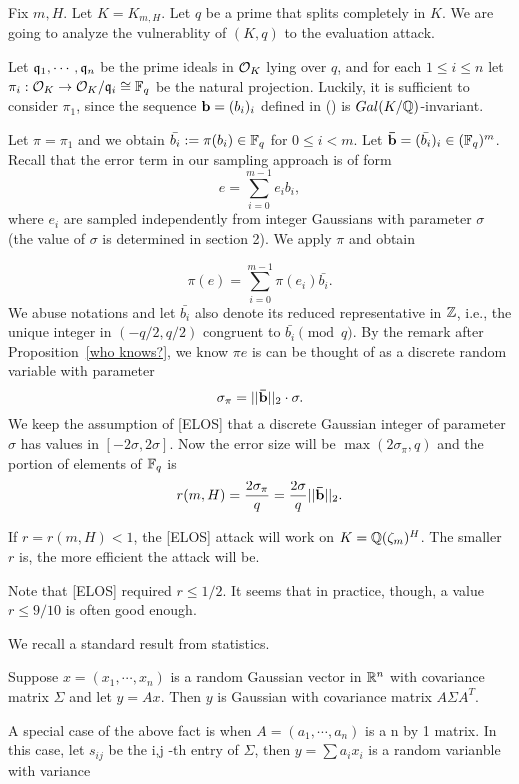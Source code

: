 \documentclass{amsart}
\begin{document}
{Fix $m, H$. Let $K = K_{m,H}$. Let $q$ be a prime that splits completely in $K$. We are going to analyze the vulnerablity of $(K,q)$ to the evaluation attack.

Let $\mathfrak{q}_1, \cdots, \mathfrak{q}_n$ be the prime ideals in $\mathcal{O}_K$
lying over $q$, and for each $1 \leq i \leq n$ let $\pi_i: \mathcal{O}_K \to \mathcal{O}_K/\mathfrak{q}_i \cong \mathbb{F}_q$ be the natural projection. Luckily, it is sufficient to consider $\pi_1$, since the sequence ${\bf b} = (b_i)_i$ defined in () is $Gal(K/\mathbb{Q})$-invariant.

Let $\pi = \pi_1$ and we obtain $\bar{b_i} :=  \pi(b_i) \in \mathbb{F}_q$ for $0 \leq i < m$. Let ${\bf \bar{b}} = (\bar{b_i})_i \in (\mathbb{F}_q)^m$. Recall that the error term in our sampling approach is of form
\[
    e = \sum_{i = 0}^{m-1} e_i b_i,
\]
where $e_i$ are sampled independently from integer Gaussians with parameter $\sigma$ (the value of $\sigma$ is  determined in section 2). We apply $\pi$ and obtain

\[
    \pi(e) = \sum_{i=0}^{m-1} \pi(e_i) \bar{b_i}.
\]
We abuse notations and let $\bar{b_i}$ also denote its reduced representative in $\mathbb{Z}$, i.e., the unique integer in $(-q/2, q/2)$ congruent to $\bar{b_i} \pmod{q}$. By the remark after Proposition~\ref{who knows?}, we know $\pi{e}$ is can be thought of as a discrete random variable with parameter
\[
    \sigma_\pi = ||{\bf \bar{b}}||_2 \cdot \sigma.
\]
We keep the assumption of [ELOS] that a discrete Gaussian
integer of parameter $\sigma$ has values in $[-2\sigma, 2\sigma]$. Now the error size will be $\max(2 \sigma_\pi, q)$ and the portion of elements of $\mathbb{F}_q$ is
\[
    r(m,H) = \frac{2\sigma_\pi}{q} = \frac{2\sigma}{q} ||{\bf \bar{b}}||_2.
\]

\begin{theorem}
If $r = r(m,H) < 1$, the [ELOS] attack will work on $K = \mathbb{Q}(\zeta_m)^H$. The smaller $r$ is, the more efficient the attack will be.
\end{theorem}

Note that [ELOS] required $r \leq 1/2$. It seems that in  practice, though, a value $r \leq 9/10$ is often good enough.


We recall a standard result from statistics.
\begin{Fact}
Suppose $x = (x_1, \cdots,x_n)$ is a random Gaussian vector in $\mathbb{R}^n$ with covariance matrix $\Sigma$ and let $y = Ax$. Then $y$ is Gaussian with covariance matrix $A\Sigma A^T$.
\end{Fact}

A special case of the above fact is when $A = (a_1, \cdots, a_n)$ is a n by 1 matrix. In this case, let $s_{ij}$ be the i,j -th entry of $\Sigma$, then $y = \sum a_i x_i$ is a random varianble with variance

}
\end{document}
